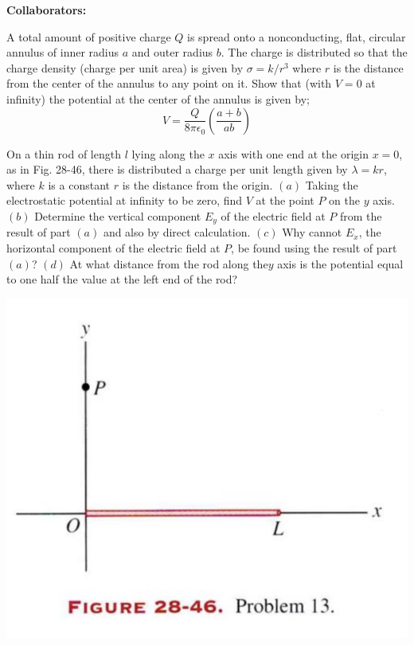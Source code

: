 \documentclass[11pt,letterpaper,boxed]{hmcpset}
\begin{document}
\noindent\textbf{Collaborators:} 


\begin{problem}
A total amount of positive charge $Q$ is spread onto a nonconducting, flat, circular annulus of inner radius $a$ and outer radius $b$. The charge is distributed so that the charge density (charge per unit area) is given by $\sigma = k/r^3$ where $r$ is the distance from the center of the annulus to any point on it. Show that (with $V=0$ at infinity) the potential at the center of the annulus is given by; 
$$ V= \frac{Q}{8\pi \epsilon_0}\left( \frac{a+b}{ab}\right)$$
\end{problem}

\begin{solution}
\vfill
\end{solution}
\newpage

\begin{problem}[HRK 28.13]
On a thin rod of length $l$ lying along the $x$ axis with one end at the origin $x=0$, as in Fig. 28-46, there is distributed a charge per unit length given by $\lambda =kr$, where $k$ is a constant $r$ is the distance from the origin. $(a)$ Taking the electrostatic potential at infinity to be zero, find $V$ at the point $P$ on the $y$ axis. $(b)$ Determine the vertical component $E_y$ of the electric field at $P$ from the result of part $(a)$ and also by direct calculation. $(c)$ Why cannot $E_x$, the horizontal component of the electric field at $P$, be found using the result of part $(a)$? $(d)$ At what distance from the rod along the$y$ axis is the potential equal to one half the value at the left end of the rod?
\begin{center}
\includegraphics[scale=0.6]{28-46.png}
\end{center}
\end{problem}
\end{document}
